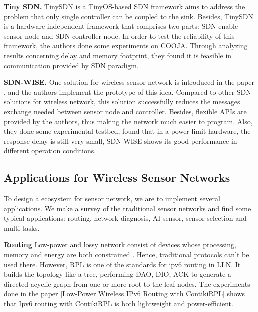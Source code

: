 \textbf{Tiny SDN.}
TinySDN \cite{de2015tinysdn} is a TinyOS-based SDN framework aims to address the problem that only single controller can be coupled to the sink. Besides, TinySDN is a hardware independent framework that comprises two parts: SDN-enable sensor node and SDN-controller node. In order to test the reliability of this framework, the authors done some experiments on COOJA. Through analyzing results concerning delay and memory footprint, they found it is feasible in communication provided by SDN paradigm.

\textbf{SDN-WISE.}
One solution for wireless sensor network is introduced in the paper \cite{galluccio2015sdn}, and the authors implement the prototype of this idea. Compared to other SDN solutions for wireless network, this solution successfully reduces the messages exchange needed between sensor node and controller. Besides, flexible APIs are provided by the authors, thus making the network much easier to program. Also, they done some experimental testbed, found that in a power limit hardware, the response delay is still very small, SDN-WISE shows its good performance in different operation conditions.


\subsection{Applications for Wireless Sensor Networks}

To design a ecosystem for sensor network, 
we are to implement several applications.  
We make a survey of the traditional sensor 
networks  and find some typical applications: 
routing, network diagnosis, AI sensor, sensor selection and multi-tasks.

\textbf{Routing}
Low-power and lossy network consist of devices whose processing, memory and energy are both constrained \cite{Winter2012}. Hence, traditional protocols can’t be used there. However, RPL is one of the standards for ipv6 routing in LLN. It builds the topology like a tree, performing DAO, DIO, ACK to generate a directed acyclic graph from one or more root to the leaf nodes. The experiments done in the paper [Low-Power Wireless IPv6 Routing with ContikiRPL] \cite{Tsiftes2010a} shows that Ipv6 routing with ContikiRPL is both lightweight and power-efficient.
 
